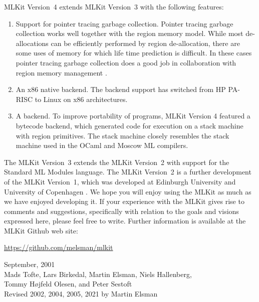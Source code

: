 \documentclass[12pt]{book}
\begin{document}
MLKit Version~4 extends
MLKit Version~3 with the following features:
\begin{enumerate}
\item Support for pointer tracing garbage collection. Pointer tracing
  garbage collection works well together with the region memory model.
  While most de-allocations can be efficiently performed by region
  de-allocation, there are some uses of memory for which life time
  prediction is difficult. In these cases pointer tracing garbage
  collection does a good job in collaboration with region memory
  management \cite{hallenberg99,het02}.
\item An x86 native backend. The
  backend support has switched from HP PA-RISC to Linux on x86
  architectures.

\item A %
  backend. To improve portability of programs, MLKit Version 4
  featured a bytecode backend, which generated code for execution
  on a stack machine with region primitives. The stack
  machine closely resembles the stack machine used in the OCaml and
  Moscow ML compilers.
\end{enumerate}

The
%
MLKit Version~3 extends the MLKit Version~2 with support for the
Standard ML Modules language. The
%
MLKit Version~2 is a further development of the
%
MLKit Version~1, which was developed at Edinburgh University and
University of Copenhagen \cite{brtt93}.  We hope you will enjoy using
the MLKit as much as we have enjoyed developing it. If
your experience with the MLKit gives rise to comments and suggestions,
specifically with relation to the goals and visions expressed here,
please feel free to write.  Further information is available at the
MLKit
%
Github web site:
\begin{tabbing}
\hskip2cm\url{https://github.com/melsman/mlkit}
\end{tabbing}

\begin{flushright}
September, 2001\\[5mm]
Mads Tofte, Lars Birkedal, Martin Elsman, Niels Hallenberg, \\
Tommy H\o jfeld Olesen, and Peter Sestoft \\[5mm]
Revised 2002, 2004, 2005, 2021 by Martin Elsman
\end{flushright}
\end{document}
